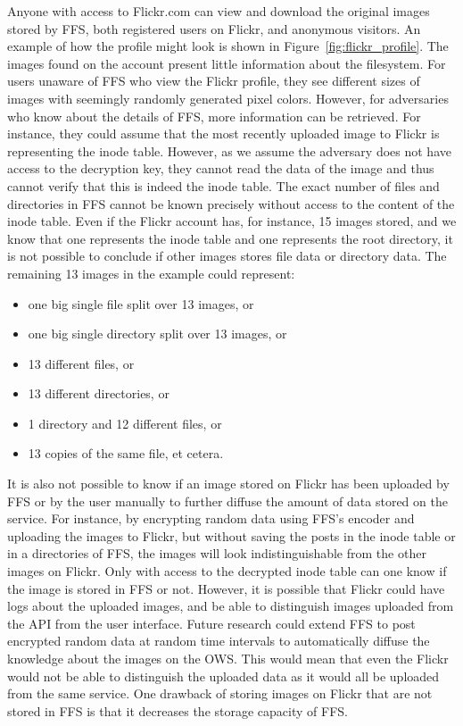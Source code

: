 Anyone with access to Flickr.com can view and download the original images stored by FFS, both registered users on Flickr, and anonymous visitors. An example of how the profile might look is shown in Figure~\ref{fig:flickr_profile}. The images found on the account present little information about the filesystem. For users unaware of FFS who view the Flickr profile, they see different sizes of images with seemingly randomly generated pixel colors. However, for adversaries who know about the details of FFS, more information can be retrieved. For instance, they could assume that the most recently uploaded image to Flickr is representing the inode table. However, as we assume the adversary does not have access to the decryption key, they cannot read the data of the image and thus cannot verify that this is indeed the inode table. The exact number of files and directories in FFS cannot be known precisely without access to the content of the inode table. Even if the Flickr account has, for instance, 15 images stored, and we know that one represents the inode table and one represents the root directory, it is not possible to conclude if other images stores file data or directory data. The remaining 13 images in the example could represent:
\begin{itemize}
	\item one big single file split over 13 images, or
	\item one big single directory split over 13 images, or
	\item 13 different files, or
	\item 13 different directories, or
	\item 1 directory and 12 different files, or
	\item 13 copies of the same file, et cetera.
\end{itemize}
It is also not possible to know if an image stored on Flickr has been uploaded by FFS or by the user manually to further diffuse the amount of data stored on the service. For instance, by encrypting random data using FFS's encoder and uploading the images to Flickr, but without saving the posts in the inode table or in a directories of FFS, the images will look indistinguishable from the other images on Flickr. Only with access to the decrypted inode table can one know if the image is stored in FFS or not. However, it is possible that Flickr could have logs about the uploaded images, and be able to distinguish images uploaded from the API from the user interface. Future research could extend FFS to post encrypted random data at random time intervals to automatically diffuse the knowledge about the images on the OWS. This would mean that even the Flickr would not be able to distinguish the uploaded data as it would all be uploaded from the same service. One drawback of storing images on Flickr that are not stored in FFS is that it decreases the storage capacity of FFS.

